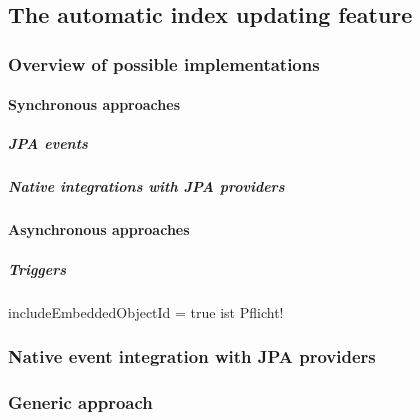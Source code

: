 \subsection{The automatic index updating feature}

\subsubsection{Overview of possible implementations}

\paragraph{Synchronous approaches}

\subparagraph{JPA events}

\subparagraph{Native integrations with JPA providers}

\paragraph{Asynchronous approaches}

\subparagraph{Triggers}

includeEmbeddedObjectId = true ist Pflicht!

\subsubsection{Native event integration with JPA providers}

\subsubsection{Generic approach}

\pagebreak